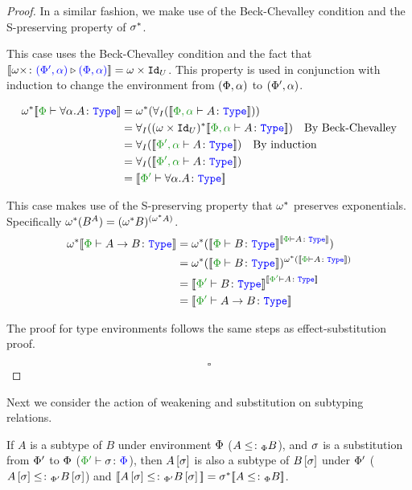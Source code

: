 \documentclass{Report}
\begin{document}
\begin{proof}
   In a similar fashion, we make use of the Beck-Chevalley condition and the S-preserving property of $\si\star$.

        This case uses the Beck-Chevalley condition and the fact that $\deno{\wrel{\w\x}{(\P', \a)}{(\P,\a)}} = \w\times \Id{U}$. This property is used in conjunction with induction to change the environment from $(\P, \a)$ to $(\P', \a)$.

        \begin{align*}
            \w\star\deno{\typerelation{\P}{\all{\a}A}{\type}} & = \w\star(\allI(\deno{\typerelation{\P,\a}{A}{\type}}))\\
            & = \allI((\w\times\Id{U})\star\deno{\typerelation{\P,\a}{A}{\type}})\qt{By Beck-Chevalley}\\
            & = \allI(\deno{\typerelation{\P',\a}{A}{\type}})\qt{By induction}\\
            & = \allI(\deno{\typerelation{\P',\a}{A}{\type}})\\
            & = \deno{\typerelation{\P'}{\all{\a}{A}}{\type}}\\
        \end{align*}
    
    This case makes use of the S-preserving property that $\w\star$ preserves exponentials. Specifically $\w\star(B^A) = (\w\star B)^{(\w\star A)}$.
    \begin{align*}
        \w\star\deno{\typerelation{\P}{\ab}{\type}} &= \w\star(\deno{\typerelation{\P}{B}{\type}}^{\deno{\typerelation{\P}{A}{\type}}})\\
        &=\w\star(\deno{\typerelation{\P}{B}{\type}})^{\w\star(\deno{\typerelation{\P}{A}{\type}})}\\
        & = \deno{\typerelation{\P'}{B}{\type}}^{\deno{\typerelation{\P'}{A}{\type}}}\\
        & = \deno{\typerelation{\P'}{\ab}{\type}}\\
    \end{align*}

    
    The proof for type environments follows the same steps as effect-substitution proof.

    $$\square$$
\end{proof}


Next we consider the action of weakening and substitution on subtyping relations. 

\begin{theorem}
    If $A$ is a subtype of $B$ under environment $\P$ ($A \subtypep B$), and $\si$ is a substitution from $\P'$ to $\P$ ($\typerelation{\P'}{\si}{\P}$), then $A\ssi$ is also a subtype of $B\ssi$ under $\P'$ ($A\ssi\subtypepp B\ssi$) and $\deno{A\ssi\subtypepp B\ssi} = \si\star\deno{A\subtypep B}$.
\end{theorem}
\end{document}

